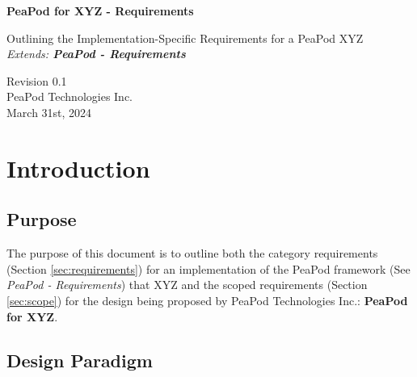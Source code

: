 \documentclass{../../../../docs/tex/report}
\begin{document}
\begin{titlepage}
    \begin{center}
        \vspace*{1.2cm}

        \textbf{\large{PeaPod for XYZ - Requirements}}

        \vspace{0.5cm}

        Outlining the Implementation-Specific Requirements for a PeaPod XYZ\\

        \textit{Extends: \textbf{PeaPod - Requirements}}

        \vfill
        
        \vspace{1.25cm}

        Revision 0.1\\
        PeaPod Technologies Inc.\\
        March 31st, 2024

    \end{center}
\end{titlepage}

\thispagestyle{plain}

\tableofcontents
\newpage

\section{Introduction}
\label{sec:intro}

\subsection{Purpose}
\label{sec:purpose}

The purpose of this document is to outline both the category requirements (Section \ref{sec:requirements}) for an implementation of the PeaPod framework (See \textit{PeaPod - Requirements}) that XYZ and the scoped requirements (Section \ref{sec:scope}) for the design being proposed by PeaPod Technologies Inc.: \textbf{PeaPod for XYZ}.

\subsection{Design Paradigm}
\label{sec:structure}



\clearpage
\end{document}
